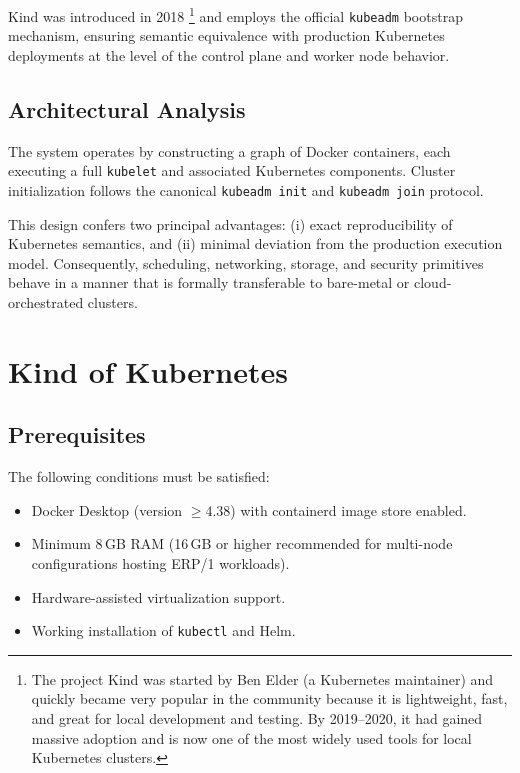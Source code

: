 \documentclass{article}
\begin{document}
Kind was introduced in 2018 \footnote{The project Kind was started by Ben Elder (a Kubernetes maintainer)
and quickly became very popular in the community because it is lightweight, fast, and great for local
development and testing. By 2019–2020, it had gained massive adoption and is now one of the most widely used tools
for local Kubernetes clusters.} and employs the official \texttt{kubeadm} bootstrap mechanism,
ensuring semantic equivalence with production Kubernetes deployments at the level of the control plane and worker node behavior.

\subsection{Architectural Analysis}

The system operates by constructing a graph of Docker containers, each executing a full \texttt{kubelet} and
associated Kubernetes components. Cluster initialization follows the canonical \texttt{kubeadm init} and \texttt{kubeadm join} protocol.

This design confers two principal advantages: (i) exact reproducibility of Kubernetes semantics, and (ii)
minimal deviation from the production execution model. Consequently, scheduling, networking, storage,
and security primitives behave in a manner that is formally transferable to bare-metal or cloud-orchestrated clusters.

\newpage
\section{Kind of Kubernetes}

\subsection{Prerequisites}

The following conditions must be satisfied:

\begin{itemize}
    \item Docker Desktop (version $\geq 4.38$) with containerd image store enabled.
    \item Minimum 8\,GB RAM (16\,GB or higher recommended for multi-node configurations hosting ERP/1 workloads).
    \item Hardware-assisted virtualization support.
    \item Working installation of \texttt{kubectl} and Helm.
\end{itemize}
\end{document}
